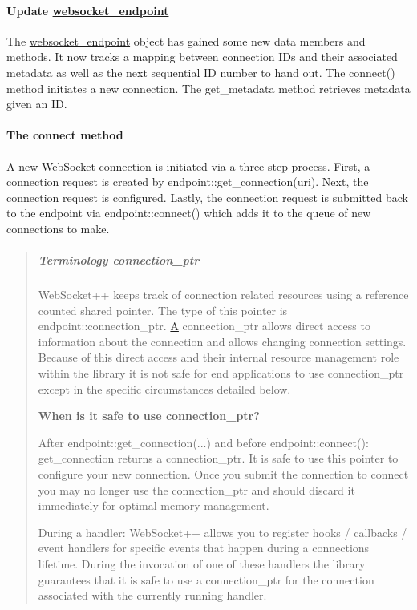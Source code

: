 \paragraph*{Update {\ttfamily \mbox{\hyperlink{classwebsocket__endpoint}{websocket\+\_\+endpoint}}}}

The {\ttfamily \mbox{\hyperlink{classwebsocket__endpoint}{websocket\+\_\+endpoint}}} object has gained some new data members and methods. It now tracks a mapping between connection I\+Ds and their associated metadata as well as the next sequential ID number to hand out. The {\ttfamily connect()} method initiates a new connection. The {\ttfamily get\+\_\+metadata} method retrieves metadata given an ID.

\paragraph*{The connect method}

\mbox{\hyperlink{struct_a}{A}} new Web\+Socket connection is initiated via a three step process. First, a connection request is created by {\ttfamily endpoint\+::get\+\_\+connection(uri)}. Next, the connection request is configured. Lastly, the connection request is submitted back to the endpoint via {\ttfamily endpoint\+::connect()} which adds it to the queue of new connections to make.

\begin{quote}
\subparagraph*{Terminology {\ttfamily connection\+\_\+ptr}}

Web\+Socket++ keeps track of connection related resources using a reference counted shared pointer. The type of this pointer is {\ttfamily endpoint\+::connection\+\_\+ptr}. \mbox{\hyperlink{struct_a}{A}} {\ttfamily connection\+\_\+ptr} allows direct access to information about the connection and allows changing connection settings. Because of this direct access and their internal resource management role within the library it is not safe for end applications to use {\ttfamily connection\+\_\+ptr} except in the specific circumstances detailed below.

{\bfseries When is it safe to use {\ttfamily connection\+\_\+ptr}?}
\begin{DoxyItemize}
\item After {\ttfamily endpoint\+::get\+\_\+connection(...)} and before {\ttfamily endpoint\+::connect()}\+: {\ttfamily get\+\_\+connection} returns a {\ttfamily connection\+\_\+ptr}. It is safe to use this pointer to configure your new connection. Once you submit the connection to {\ttfamily connect} you may no longer use the {\ttfamily connection\+\_\+ptr} and should discard it immediately for optimal memory management.
\item During a handler\+: Web\+Socket++ allows you to register hooks / callbacks / event handlers for specific events that happen during a connection\textquotesingle{}s lifetime. During the invocation of one of these handlers the library guarantees that it is safe to use a {\ttfamily connection\+\_\+ptr} for the connection associated with the currently running handler. 
\end{DoxyItemize}\end{quote}


